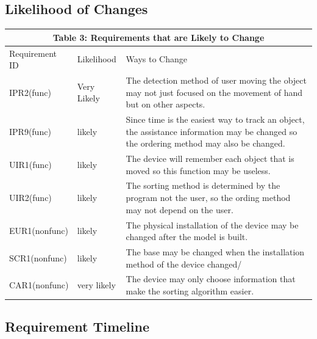 \documentclass[12pt]{article}
\begin{document}
\subsection{Likelihood of Changes}

\begin{tabular}{|p{}|p{}|p{}|}

\hline \multicolumn{3}{|c|}{Table 3: Requirements that are Likely to Change}\\

\hline Requirement ID&Likelihood&Ways to Change\\

\hline IPR2(func)&Very Likely&The detection method of user moving the object may not just focused on the movement of hand but on other aspects.\\

\hline IPR9(func)&likely&Since time is the easiest way to track an object, the assistance information may be changed so the ordering method may also be changed.\\

\hline UIR1(func)&likely&The device will remember each object that is moved so this function may be useless.\\

\hline UIR2(func)&likely&The sorting method is determined by the program not the user, so the ording method may not depend on the user. \\

\hline EUR1(nonfunc)&likely&The physical installation of the device may be changed after the model is built.\\

\hline SCR1(nonfunc)&likely&The base may be changed when the installation method of the device changed/\\

\hline CAR1(nonfunc)&very likely&The device may only choose information that make the sorting algorithm easier.\\

\hline

\end{tabular}

\subsection{Requirement Timeline}
\end{document}

